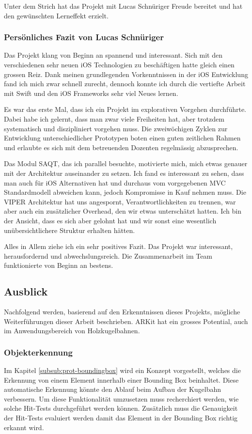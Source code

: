 Unter dem Strich hat das Projekt mit Lucas Schnüriger Freude bereitet und hat den gewünschten Lerneffekt erzielt.

\subsubsection{Persönliches Fazit von Lucas Schnüriger}

Das Projekt klang von Beginn an spannend und interessant.
Sich mit den verschiedenen sehr neuen iOS Technologien zu beschäftigen hatte gleich einen grossen Reiz.
Dank meinen grundlegenden Vorkenntnissen in der iOS Entwicklung fand ich mich zwar schnell zurecht, dennoch konnte ich durch die vertiefte Arbeit mit Swift und den iOS Frameworks sehr viel Neues lernen.

Es war das erste Mal, dass ich ein Projekt im explorativen Vorgehen durchführte.
Dabei habe ich gelernt, dass man zwar viele Freiheiten hat, aber trotzdem systematisch und diszipliniert vorgehen muss.
Die zweiwöchigen Zyklen zur Entwicklung unterschiedlicher Prototypen boten einen guten zeitlichen Rahmen und erlaubte es sich mit dem betreuenden Dozenten regelmässig abzusprechen.

Das Modul SAQT, das ich parallel besuchte, motivierte mich, mich etwas genauer mit der Architektur auseinander zu setzen.
Ich fand es interessant zu sehen, dass man auch für iOS Alternativen hat und durchaus vom vorgegebenen MVC Standardmodell abweichen kann, jedoch Kompromisse in Kauf nehmen muss.
Die VIPER Architektur hat uns angespornt, Verantwortlichkeiten zu trennen, war aber auch ein zusätzlicher Overhead, den wir etwas unterschätzt hatten.
Ich bin der Ansicht, dass es sich aber gelohnt hat und wir sonst eine wesentlich unübersichtlichere Struktur erhalten hätten.

Alles in Allem ziehe ich ein sehr positives Fazit.
Das Projekt war interessant, herausfordernd und abwechslungsreich.
Die Zusammenarbeit im Team funktionierte von Beginn an bestens.

\subsection{Ausblick}

Nachfolgend werden, basierend auf den Erkenntnissen dieses Projekts, mögliche Weiterführungen dieser Arbeit beschrieben.
ARKit hat ein grosses Potential, auch im Anwendungsbereich von Holzkugelbahnen.

\subsubsection{Objekterkennung}
Im Kapitel \ref{subsub:prot-boundingbox} wird ein Konzept vorgestellt, welches die Erkennung von einem Element innerhalb einer Bounding Box beinhaltet. Diese automatische Erkennung könnte den Ablauf beim Aufbau der Kugelbahn verbessern. Um diese Funktionalität umzusetzen muss recherchiert werden, wie solche Hit-Tests durchgeführt werden können. Zusätzlich muss die Genauigkeit der Hit-Tests evaluiert werden damit das Element in der Bounding Box richtig erkannt wird.

